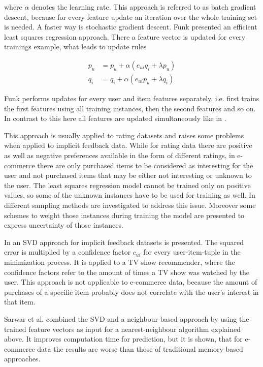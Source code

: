 \documentclass[10pt]{reportMaster}
\begin{document}
where $\alpha$ denotes the learning rate.
This approach is referred to as batch gradient descent, because for every feature update an iteration over the whole training set is needed.
A faster way is stochastic gradient descent.
Funk \cite{funkLeastSquares} presented an efficient least squares regression approach.
There a feature vector is updated for every trainings example, what leads to update rules 

\begin{align*}
	p_u &= p_u + \alpha (e_{ui} q_i + \lambda p_u) \\
	q_i &= q_i + \alpha (e_{ui} p_u + \lambda q_i)
\end{align*}

Funk performs updates for every user and item features separately, i.e. first trains the first features using all training instances, then the second features and so on.
In contrast to this here all features are updated simultaneously like in \cite{matrixFactorizationDifRegParam}.

This approach is usually applied to rating datasets and raises some problems when applied to implicit feedback data.
While for rating data there are positive as well as negative preferences available in the form of different ratings, in e-commerce there are only purchased items to be considered as interesting for the user and not purchased items that may be either not interesting or unknown to the user.
The least squares regression model cannot be trained only on positive values, so some of the unknown instances have to be used for training as well.
In \cite{occf} different sampling methods are investigated to address this issue.
Moreover some schemes to weight those instances during training the model are presented to express uncertainty of those instances.

In \cite{CFForImplFeedback} an SVD approach for implicit feedback datasets is presented.
The squared error is multiplied by a confidence factor $c_{ui}$ for every user-item-tuple in the minimization process.
It is applied to a TV show recommender, where the confidence factors refer to the amount of times a TV show was watched by the user.
This approach is not applicable to e-commerce data, because the amount of purchases of a specific item probably does not correlate with the user's interest in that item.

Sarwar et al. \cite{nnOnSvd} combined the SVD and a neighbour-based approach by using the trained feature vectors as input for a nearest-neighbour algorithm explained above.
It improves computation time for prediction, but it is shown, that for e-commerce data the results are worse than those of traditional memory-based approaches.
\end{document}
